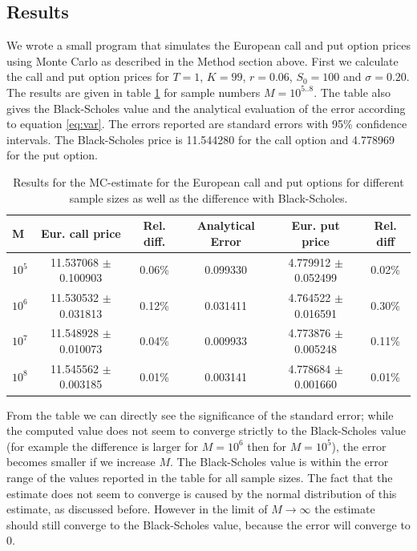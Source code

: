 \documentclass[11pt,a4paper]{article}
\begin{document}
\subsection{Results}
We wrote a small program that simulates the European call and put option prices using Monte Carlo as described in the Method section above. First we calculate the call and put option prices for $T = 1$, $K = 99$, $r = 0.06$, $S_0 = 100$ and $\sigma = 0.20$. The results are given in table \ref{tab:conv} for sample numbers $M = 10^{5..8}$. The table also gives the Black-Scholes value and the analytical evaluation of the error according to equation \ref{eq:var}. The errors reported are standard errors with 95\% confidence intervals. The Black-Scholes price is 11.544280 for the call option and 4.778969 for the put option.

\begin{table}[H]
  \centering
  \begin{tabular}{l || c | c | c | c | c}
    \hline
    M & Eur. call price & Rel. diff. & Analytical Error & Eur. put price & Rel. diff \\
    \hline
    $10^5$ & 11.537068 $\pm$ 0.100903 & 0.06\% & 0.099330 & 4.779912 $\pm$ 0.052499 & 0.02\% \\
    $10^6$ & 11.530532 $\pm$ 0.031813 & 0.12\% & 0.031411 & 4.764522 $\pm$ 0.016591 & 0.30\% \\
    $10^7$ & 11.548928 $\pm$ 0.010073 & 0.04\% & 0.009933 & 4.773876 $\pm$ 0.005248 & 0.11\% \\
    $10^8$ & 11.545562 $\pm$ 0.003185 & 0.01\% & 0.003141 & 4.778684 $\pm$ 0.001660 & 0.01\% \\
  \end{tabular}
  \caption{Results for the MC-estimate for the European call and put options for different sample sizes as well as the difference with Black-Scholes.}
  \label{tab:conv}
\end{table}

From the table we can directly see the significance of the standard error; while the computed value does not seem to converge strictly to the Black-Scholes value (for example the difference is larger for $M = 10^6$ then for $M = 10^5$), the error becomes smaller if we increase $M$. The Black-Scholes value is within the error range of the values reported in the table for all sample sizes. The fact that the estimate does not seem to converge is caused by the normal distribution of this estimate, as discussed before. However in the limit of $M \rightarrow \infty$ the estimate should still converge to the Black-Scholes value, because the error will converge to 0.
\end{document}
